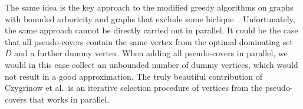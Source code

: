The same idea is the key approach to the modified greedy algorithms
on graphs with bounded arboricity and graphs that exclude some biclique~\cite{jones2017parameterized,siebertz2019greedy}. Unfortunately,
the same approach cannot be directly carried out in parallel. It could be
the case that all pseudo-covers contain the same vertex from the
optimal dominating set $D$ and a further dummy vertex. When adding
all pseudo-covers in parallel, we would in this case collect an unbounded
number of dummy vertices, which would not result in a good
approximation. The truly beautiful contribution of Czygrinow et al.\ is
an iterative selection procedure of vertices from the pseudo-covers
that works in parallel.
